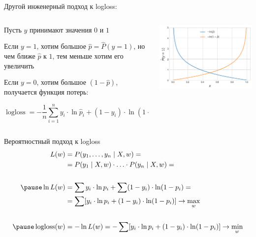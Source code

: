 \documentclass[notes,12pt, aspectratio=169]{beamer}
\newenvironment{wideitemize}{\itemize\addtolength{\itemsep}{10pt}}{\enditemize}
\DeclareMathOperator{\logloss}{logloss}
\begin{document}
\begin{frame}{Другой инженерный подход к logloss:}
	\begin{columns}[T] %
		\begin{column}{.49\textwidth}
				\begin{wideitemize}
						\item Пусть $y$ принимают значения $0$ и $1$ 
						\item Если $y = 1$, хотим большое $\hat p = \hat P(y = 1)$, но чем ближе $\hat p$ к $1$, тем меньше хотим его увеличить 
						\item Если $y = 0$, хотим большое $(1 - \hat p)$, получается функция потерь: 
						
						$$
						\logloss = - \frac{1}{n} \sum_{i=1}^n y_i \cdot \ln \hat p_i + (1 - y_i) \cdot \ln (1 - \hat p_i)
						$$
					\end{wideitemize}	
			\end{column}%
		\hfill%
		\begin{column}{.49\textwidth}
				\begin{center}
						\includegraphics[width= 0.95\linewidth]{log_loss_05.png}
					\end{center}
			\end{column}%
	\end{columns}
\end{frame}
		
\begin{frame}{Вероятностный подход к logloss}
	\begin{equation*} 
			\begin{aligned}
					L(w) &=P(y_1, \ldots, y_n \mid X, w) =  \\ 
					&= P(y_1 \mid X,w) \cdot \ldots \cdot P(y_n \mid X, w) =  \\ 
					\mbox{ } \\  \pause 
					\ln L(w) & = \sum y_i \cdot \ln p_i + \sum(1 - y_i) \cdot \ln(1 - p_i) = \\ 
					&= \sum [ y_i \cdot \ln p_i + (1 - y_i) \cdot \ln(1 - p_i)] \to \max_{w} \\
					\mbox{ } \\  \pause 
					\logloss(w) & = -\ln L(w) = - \sum [ y_i \cdot \ln p_i + (1 - y_i) \cdot \ln(1 - p_i)]  \to \min_{w} 
				\end{aligned}
		\end{equation*}
\end{frame}
\end{document}

